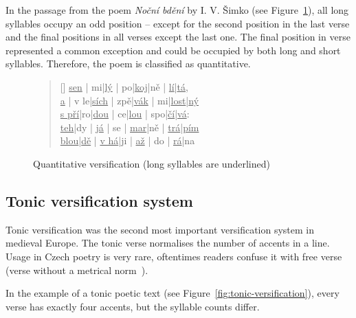 In the passage from the poem \emph{Noční bdění} by I. V. Šimko (see Figure~\ref{fig:quantitative-versification}), all long syllables occupy an odd position -- except for the second position in the last verse and the final positions in all verses except the last one. The final position in verse represented a common exception and could be occupied by both long and short syllables. Therefore, the poem is classified as quantitative.~\cite{TeorieLiteraturySS}

\begin{figure}[htpb]
    \centering
    \begin{verse}[\versewidth]
    \uline{sen} | mi|\uline{lý} | po|\uline{koj}|ně | \uline{lí}|\uline{tá},\\
    \uline{a} | v le|\uline{sích} | zpě|\uline{vák} | mi|\uline{lost}|\uline{ný}\\
    \uline{s pří}|ro|\uline{dou} | ce|\uline{lou} | spo|\uline{čí}|\uline{vá}:\\
    \uline{teh}|dy | \uline{já} | se | \uline{mar}|ně | \uline{trá}|\uline{pím}\\
    \uline{blou}|\uline{dě} | \uline{v há}|ji | \uline{až} | do | \uline{rá}|na\\
    \end{verse}
    \caption[Quantitative versification]{Quantitative versification (long syllables are underlined)}\label{fig:quantitative-versification}
\end{figure}

\subsection{Tonic versification system}
Tonic versification was the second most important versification system in medieval Europe. The tonic verse normalises the number of accents in a line. Usage in Czech poetry is very rare, oftentimes readers confuse it with free verse~\cite{UvodTeorieVerse} (verse without a metrical norm~\cite{TeorieLiteraturySS}).

In the example of a tonic poetic text (see Figure~\ref{fig:tonic-versification}), every verse has exactly four accents, but the syllable counts differ.~\cite{UvodTeorieVerse}


